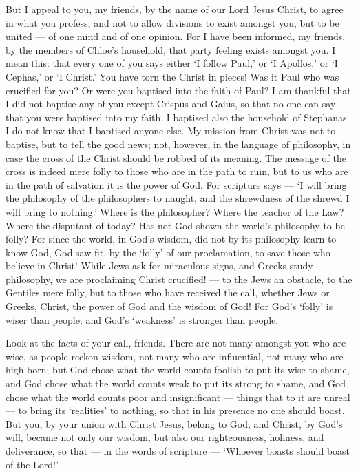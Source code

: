  But I appeal to you, my friends, by the name of our Lord
Jesus Christ, to agree in what you profess, and not to allow divisions
to exist amongst you, but to be united --- of one mind and of one
opinion.  For I have been informed, my friends, by the
members of Chloe's household, that party feeling exists amongst you.
 I mean this: that every one of you says either `I follow
Paul,' or `I Apollos,' or `I Cephas,' or `I Christ.'  You
have torn the Christ in pieces! Was it Paul who was crucified for you?
Or were you baptised into the faith of Paul?  I am thankful
that I did not baptise any of you except Crispus and Gaius,
 so that no one can say that you were baptised into my
faith.  I baptised also the household of Stephanas. I do
not know that I baptised anyone else.  My mission from
Christ was not to baptise, but to tell the good news; not, however, in
the language of philosophy, in case the cross of the Christ should be
robbed of its meaning.  The message of the cross is indeed
mere folly to those who are in the path to ruin, but to us who are in
the path of salvation it is the power of God.  For
scripture says --- `I will bring the philosophy of the philosophers to
naught, and the shrewdness of the shrewd I will bring to nothing.'
 Where is the philosopher? Where the teacher of the Law?
Where the disputant of today? Has not God shown the world's philosophy
to be folly?  For since the world, in God's wisdom, did not
by its philosophy learn to know God, God saw fit, by the `folly' of our
proclamation, to save those who believe in Christ!  While
Jews ask for miraculous signs, and Greeks study philosophy,
 we are proclaiming Christ crucified! --- to the Jews an
obstacle, to the Gentiles mere folly,  but to those who
have received the call, whether Jews or Greeks, Christ, the power of God
and the wisdom of God!  For God's `folly' is wiser than
people, and God's `weakness' is stronger than people.

 Look at the facts of your call, friends. There are not
many amongst you who are wise, as people reckon wisdom, not many who are
influential, not many who are high-born;  but God chose
what the world counts foolish to put its wise to shame, and God chose
what the world counts weak to put its strong to shame,  and
God chose what the world counts poor and insignificant --- things that
to it are unreal --- to bring its `realities' to nothing, 
so that in his presence no one should boast.  But you, by
your union with Christ Jesus, belong to God; and Christ, by God's will,
became not only our wisdom, but also our righteousness, holiness, and
deliverance,  so that --- in the words of scripture ---
`Whoever boasts should boast of the Lord!'

